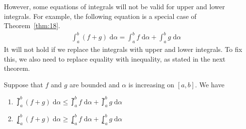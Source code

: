 \documentclass[thmcnt=section, 12pt]{my-elegantbook}
\begin{document}

However, some equations of integrals will not be valid for upper and lower integrals. For example, the following equation is a special case of Theorem~\ref{thm:18}.
\begin{align*}
    \int_{a}^{b} (f+g) \; \mathrm{d}\alpha
    = \int_{a}^{b} f \; \mathrm{d}\alpha
    + \int_{a}^{b} g \; \mathrm{d}\alpha
\end{align*}
It will not hold if we replace the integrals with upper and lower integrals. To fix this, we also need to replace equality with inequality, as stated in the next theorem.

\begin{theorem}
    Suppose that $f$ and $g$ are bounded and $\alpha$ is increasing on $[a, b]$. We have
    \begin{enumerate}
        \item $\upint_a^b (f+g) \; \mathrm{d}\alpha \leq \upint_a^b f \; \mathrm{d}\alpha + \upint_a^b g \; \mathrm{d}\alpha$
        \item $\lowint_a^b (f+g) \; \mathrm{d}\alpha \geq \lowint_a^b f \; \mathrm{d}\alpha + \lowint_a^b g \; \mathrm{d}\alpha$
    \end{enumerate}
\end{theorem}
\end{document}
